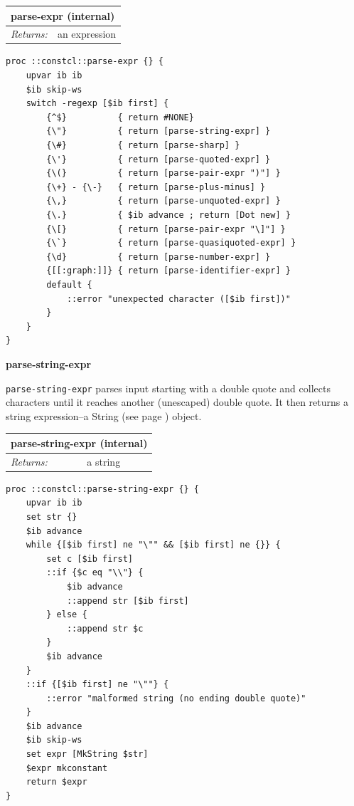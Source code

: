 \documentclass[twoside,9pt]{report}
\begin{document}
\begin{tabular}{ |l l| }
\hline
\multicolumn{2}{|l|}{parse-expr (internal)} \\
\hline
\textit{Returns:} & an expression \\
\hline
\end{tabular}

\noindent\makebox[\linewidth]{\rule{\linewidth}{0.4pt}}
\begin{lstlisting}
proc ::constcl::parse-expr {} {
    upvar ib ib
    $ib skip-ws
    switch -regexp [$ib first] {
        {^$}          { return #NONE}
        {\"}          { return [parse-string-expr] }
        {\#}          { return [parse-sharp] }
        {\'}          { return [parse-quoted-expr] }
        {\(}          { return [parse-pair-expr ")"] }
        {\+} - {\-}   { return [parse-plus-minus] }
        {\,}          { return [parse-unquoted-expr] }
        {\.}          { $ib advance ; return [Dot new] }
        {\[}          { return [parse-pair-expr "\]"] }
        {\`}          { return [parse-quasiquoted-expr] }
        {\d}          { return [parse-number-expr] }
        {[[:graph:]]} { return [parse-identifier-expr] }
        default {
            ::error "unexpected character ([$ib first])"
        }
    }
}
\end{lstlisting}
\noindent\makebox[\linewidth]{\rule{\linewidth}{0.4pt}}

\textbf{parse-string-expr}


\texttt{parse-string-expr} parses input starting with a double quote and collects characters until it reaches another (unescaped) double quote. It then returns a string expression--a String (see page \pageref{strings}) object.

\begin{tabular}{ |l l| }
\hline
\multicolumn{2}{|l|}{parse-string-expr (internal)} \\
\hline
\textit{Returns:} & a string \\
\hline
\end{tabular}

\noindent\makebox[\linewidth]{\rule{\linewidth}{0.4pt}}
\begin{lstlisting}
proc ::constcl::parse-string-expr {} {
    upvar ib ib
    set str {}
    $ib advance
    while {[$ib first] ne "\"" && [$ib first] ne {}} {
        set c [$ib first]
        ::if {$c eq "\\"} {
            $ib advance
            ::append str [$ib first]
        } else {
            ::append str $c
        }
        $ib advance
    }
    ::if {[$ib first] ne "\""} {
        ::error "malformed string (no ending double quote)"
    }
    $ib advance
    $ib skip-ws
    set expr [MkString $str]
    $expr mkconstant
    return $expr
}
\end{lstlisting}
\noindent\makebox[\linewidth]{\rule{\linewidth}{0.4pt}}
\end{document}
